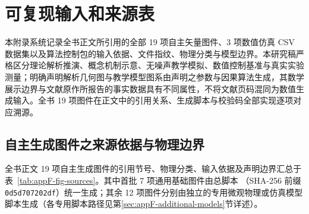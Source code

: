 \chapter{可复现输入和来源表}\label{app:reproducible-inputs}

本附录系统记录全书正文所引用的全部 19 项自主矢量图件、3 项数值仿真 CSV 数据集以及算法控制包的输入依据、文件指纹、物理分类与模型边界。本研究稿严格区分理论解析推演、概念机制示意、无噪声教学模拟、数值控制基准与真实实验测量；明确声明解析几何图与教学模型图系由声明之参数与因果算法生成，其数学展示边界与文献原作所报告的事实数据具有不同属性，不将文献页码混同为数值生成输入。全书 19 项图件在正文中的引用关系、生成脚本与校验码全部实现逐项对应溯源。

\section{自主生成图件之来源依据与物理边界}\label{sec:appF-figures-sources}

全书正文 19 项自主生成图件的引用节号、物理分类、输入依据及声明边界汇总于表~\ref{tab:appF-fig-sources}。其中首批 7 项通用基础图件由总脚本 （SHA-256 前缀 \texttt{0d5d707202df}）统一生成；其余 12 项图件分别由独立的专用微观物理或仿真模型脚本生成（各专用脚本路径见第\ref{sec:appF-additional-models}节详述）。


